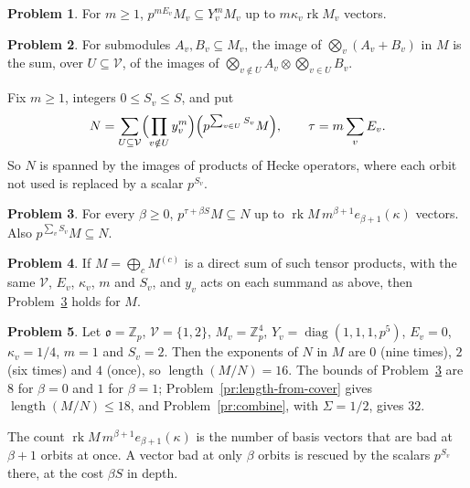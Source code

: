 \documentclass[reqno]{amsart}
\theoremstyle{definition}
\newtheorem{problem}{Problem}[section]
\theoremstyle{plain}
\theoremstyle{remark}
\newcommand{\Z}{\mathbb Z}
\newcommand{\rk}{\operatorname{rk}}
\newcommand{\len}{\operatorname{length}}
\newcommand{\vo}{\mathfrak o}
\newcommand{\Vc}{\mathcal V}
\begin{document}
\begin{problem}\label{pr:powers}
For \(m\ge1\), \(p^{mE_v}M_v\subseteq Y_v^mM_v\) up to \(m\kappa_v\rk M_v\) vectors.
\end{problem}

\begin{problem}\label{pr:expand}
For submodules \(A_v,B_v\subseteq M_v\), the image of \(\bigotimes_v(A_v+B_v)\) in \(M\) is the sum, over \(U\subseteq\Vc\), of the images of \(\bigotimes_{v\notin U}A_v\otimes\bigotimes_{v\in U}B_v\).
\end{problem}

Fix \(m\ge1\), integers \(0\le S_v\le S\), and put
\[
 N=\sum_{U\subseteq\Vc}\Bigl(\prod_{v\notin U}y_v^m\Bigr)\Bigl(p^{\sum_{v\in U}S_v}M\Bigr),\qquad \tau=m\sum_{v}E_v .
\]
So \(N\) is spanned by the images of products of Hecke operators, where each orbit not used is replaced by a scalar \(p^{S_v}\).

\begin{problem}\label{pr:tensor-count}
For every \(\beta\ge0\), \(p^{\tau+\beta S}M\subseteq N\) up to \(\rk M\,m^{\beta+1}e_{\beta+1}(\kappa)\) vectors.  Also \(p^{\sum_vS_v}M\subseteq N\).
\end{problem}

\begin{problem}\label{pr:sums}
If \(M=\bigoplus_cM^{(c)}\) is a direct sum of such tensor products, with the same \(\Vc\), \(E_v\), \(\kappa_v\), \(m\) and \(S_v\), and \(y_v\) acts on each summand as above, then Problem~\ref{pr:tensor-count} holds for \(M\).
\end{problem}

\begin{problem}\label{pr:example}
Let \(\vo=\Z_p\), \(\Vc=\{1,2\}\), \(M_v=\Z_p^4\), \(Y_v=\operatorname{diag}(1,1,1,p^5)\), \(E_v=0\), \(\kappa_v=1/4\), \(m=1\) and \(S_v=2\).  Then the exponents of \(N\) in \(M\) are \(0\) (nine times), \(2\) (six times) and \(4\) (once), so \(\len(M/N)=16\).  The bounds of Problem~\ref{pr:tensor-count} are \(8\) for \(\beta=0\) and \(1\) for \(\beta=1\); Problem~\ref{pr:length-from-cover} gives \(\len(M/N)\le18\), and Problem~\ref{pr:combine}, with \(\Sigma=1/2\), gives \(32\).
\end{problem}

The count \(\rk M\,m^{\beta+1}e_{\beta+1}(\kappa)\) is the number of basis vectors that are bad at \(\beta+1\) orbits at once.  A vector bad at only \(\beta\) orbits is rescued by the scalars \(p^{S_v}\) there, at the cost \(\beta S\) in depth.
\end{document}
